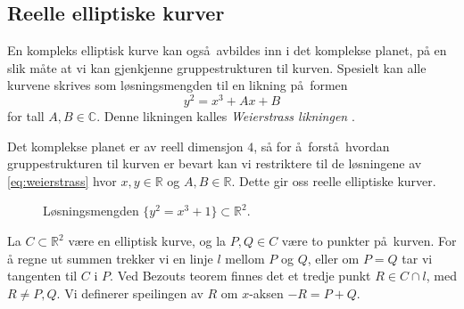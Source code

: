 \subsection{Reelle elliptiske kurver}

En kompleks elliptisk kurve kan også avbildes inn i det komplekse planet,
på en slik måte at vi kan gjenkjenne gruppestrukturen til kurven.
Spesielt kan alle kurvene skrives som løsningsmengden til en likning på formen
\begin{equation}\label{eq:weierstrass}
    y^2 = x^3 + Ax + B
\end{equation}
for tall $A,B\in \mathbb C$.
Denne likningen kalles \textit{Weierstrass likningen}
\cite[p.~45]{silverman_arithmetic_2009}.

Det komplekse planet er av reell dimensjon $4$,
så for å forstå hvordan gruppestrukturen til kurven er bevart
kan vi restriktere til de løsningene av \cref{eq:weierstrass}
hvor $x,y\in \mathbb R$ og $A,B\in \mathbb R$.
Dette gir oss reelle elliptiske kurver.

\begin{figure}[htb]
    \centering
    \caption{Løsningsmengden $\{y^2 = x^3 + 1\}\subset \mathbb R^2$.}
\end{figure}

La $C\subset \mathbb R^2$ være en elliptisk kurve,
og la $P, Q\in C$ være to punkter på kurven.
For å regne ut summen trekker vi en linje $l$ mellom $P$ og $Q$,
eller om $P = Q$ tar vi tangenten til $C$ i $P$.
Ved Bezouts teorem finnes det et tredje punkt $R\in C\cap l$,
med $R\neq P,Q$.
Vi definerer speilingen av $R$ om $x$-aksen $-R = P + Q$.

